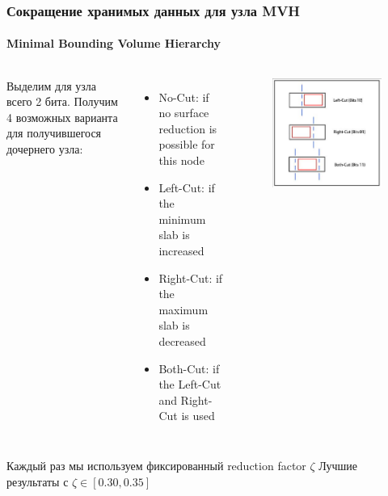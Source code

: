 \begin{frame}[t]
    \frametitle{Сокращение хранимых данных для узла MVH}
    \framesubtitle{Minimal Bounding Volume Hierarchy}
    \begin{columns}
        Выделим для узла всего 2 бита. Получим 4 возможных варианта для получившегося дочернего узла:
        \begin{itemize}
            \item
                No-Cut: if no surface reduction is possible for this node
            \item
                Left-Cut: if the minimum slab is increased
            \item
                Right-Cut: if the maximum slab is decreased
            \item
                Both-Cut: if the Left-Cut and Right-Cut is used
        \end{itemize}
        \begin{figure}
            \includegraphics[keepaspectratio, width=\textwidth]{res/splitting_mvh.png}
        \end{figure}
    \end{columns}
    \begin{block}{}
        Каждый раз мы используем фиксированный reduction factor $\zeta$
        Лучшие результаты с $\zeta \in [ 0.30, 0.35]$
    \end{block}

\end{frame}


